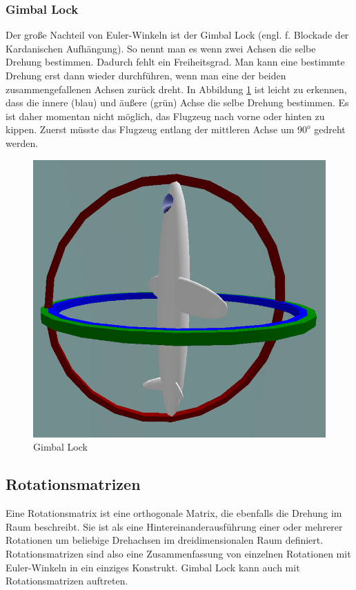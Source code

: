 \subsubsection{Gimbal Lock}
Der große Nachteil von Euler-Winkeln ist der Gimbal Lock (engl. f. Blockade der Kardanischen Aufhängung). So nennt man es wenn zwei Achsen die selbe Drehung bestimmen. Dadurch fehlt ein Freiheitsgrad. Man kann eine bestimmte Drehung erst dann wieder durchführen, wenn man eine der beiden zusammengefallenen Achsen zurück dreht. In Abbildung \ref{fig:gimbal-lock} ist leicht zu erkennen, dass die innere (blau) und äußere (grün) Achse die selbe Drehung bestimmen. Es ist daher momentan nicht möglich, das Flugzeug nach vorne oder hinten zu kippen. Zuerst müsste das Flugzeug entlang der mittleren Achse um $90^o$ gedreht werden. \cite{ paper:001}

\begin{figure}[htb]
\centering
\includegraphics[scale=0.4]{figures/gimbal-lock}
\caption{Gimbal Lock \cite{ wiki:004} }
\label{fig:gimbal-lock}
\end{figure}

\subsection{Rotationsmatrizen}
Eine Rotationsmatrix ist eine orthogonale Matrix, die ebenfalls die Drehung im Raum beschreibt. Sie ist als eine Hintereinanderausführung einer oder mehrerer Rotationen um beliebige Drehachsen im dreidimensionalen Raum definiert. Rotationsmatrizen sind also eine Zusammenfassung von einzelnen Rotationen mit Euler-Winkeln in ein einziges Konstrukt. Gimbal Lock kann auch mit Rotationsmatrizen auftreten. \cite{ wiki:003}

